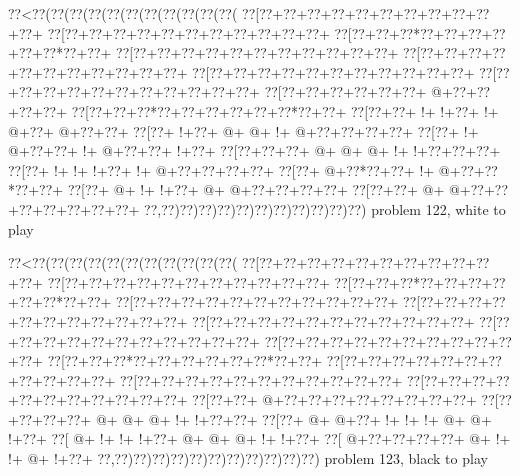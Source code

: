 \vbox{\vbox{\goo
\0??<\0??(\0??(\0??(\0??(\0??(\0??(\0??(\0??(\0??(\0??(\0??(
\0??[\0??+\0??+\0??+\0??+\0??+\0??+\0??+\0??+\0??+\0??+\0??+
\0??[\0??+\0??+\0??+\0??+\0??+\0??+\0??+\0??+\0??+\0??+\0??+
\0??[\0??+\0??+\0??*\0??+\0??+\0??+\0??+\0??+\0??*\0??+\0??+
\0??[\0??+\0??+\0??+\0??+\0??+\0??+\0??+\0??+\0??+\0??+\0??+
\0??[\0??+\0??+\0??+\0??+\0??+\0??+\0??+\0??+\0??+\0??+\0??+
\0??[\0??+\0??+\0??+\0??+\0??+\0??+\0??+\0??+\0??+\0??+\0??+
\0??[\0??+\0??+\0??+\0??+\0??+\0??+\0??+\0??+\0??+\0??+\0??+
\0??[\0??+\0??+\0??+\0??+\0??+\0??+\- @+\0??+\0??+\0??+\0??+
\0??[\0??+\0??+\0??*\0??+\0??+\0??+\0??+\0??+\0??*\0??+\0??+
\0??[\0??+\0??+\- !+\- !+\0??+\- !+\- @+\0??+\- @+\0??+\0??+
\0??[\0??+\- !+\0??+\- @+\- @+\- !+\- @+\0??+\0??+\0??+\0??+
\0??[\0??+\- !+\- @+\0??+\0??+\- !+\- @+\0??+\0??+\- !+\0??+
\0??[\0??+\0??+\0??+\- @+\- @+\- @+\- !+\- !+\0??+\0??+\0??+
\0??[\0??+\- !+\- !+\- !+\0??+\- !+\- @+\0??+\0??+\0??+\0??+
\0??[\0??+\- @+\0??*\0??+\0??+\- !+\- @+\0??+\0??*\0??+\0??+
\0??[\0??+\- @+\- !+\- !+\0??+\- @+\- @+\0??+\0??+\0??+\0??+
\0??[\0??+\0??+\- @+\- @+\0??+\0??+\0??+\0??+\0??+\0??+\0??+
\0??,\0??)\0??)\0??)\0??)\0??)\0??)\0??)\0??)\0??)\0??)\0??)
}
\hfil problem 122, white to play\hfil\break
}

\vbox{\vbox{\goo
\0??<\0??(\0??(\0??(\0??(\0??(\0??(\0??(\0??(\0??(\0??(\0??(
\0??[\0??+\0??+\0??+\0??+\0??+\0??+\0??+\0??+\0??+\0??+\0??+
\0??[\0??+\0??+\0??+\0??+\0??+\0??+\0??+\0??+\0??+\0??+\0??+
\0??[\0??+\0??+\0??*\0??+\0??+\0??+\0??+\0??+\0??*\0??+\0??+
\0??[\0??+\0??+\0??+\0??+\0??+\0??+\0??+\0??+\0??+\0??+\0??+
\0??[\0??+\0??+\0??+\0??+\0??+\0??+\0??+\0??+\0??+\0??+\0??+
\0??[\0??+\0??+\0??+\0??+\0??+\0??+\0??+\0??+\0??+\0??+\0??+
\0??[\0??+\0??+\0??+\0??+\0??+\0??+\0??+\0??+\0??+\0??+\0??+
\0??[\0??+\0??+\0??+\0??+\0??+\0??+\0??+\0??+\0??+\0??+\0??+
\0??[\0??+\0??+\0??*\0??+\0??+\0??+\0??+\0??+\0??*\0??+\0??+
\0??[\0??+\0??+\0??+\0??+\0??+\0??+\0??+\0??+\0??+\0??+\0??+
\0??[\0??+\0??+\0??+\0??+\0??+\0??+\0??+\0??+\0??+\0??+\0??+
\0??[\0??+\0??+\0??+\0??+\0??+\0??+\0??+\0??+\0??+\0??+\0??+
\0??[\0??+\0??+\- @+\0??+\0??+\0??+\0??+\0??+\0??+\0??+\0??+
\0??[\0??+\0??+\0??+\0??+\- @+\- @+\- @+\- !+\- !+\0??+\0??+
\0??[\0??+\- @+\- @+\0??+\- !+\- !+\- !+\- @+\- @+\- !+\0??+
\0??[\- @+\- !+\- !+\- !+\0??+\- @+\- @+\- @+\- !+\- !+\0??+
\0??[\- @+\0??+\0??+\0??+\0??+\- @+\- !+\- !+\- @+\- !+\0??+
\0??,\0??)\0??)\0??)\0??)\0??)\0??)\0??)\0??)\0??)\0??)\0??)
}
\hfil problem 123, black to play\hfil\break
}

